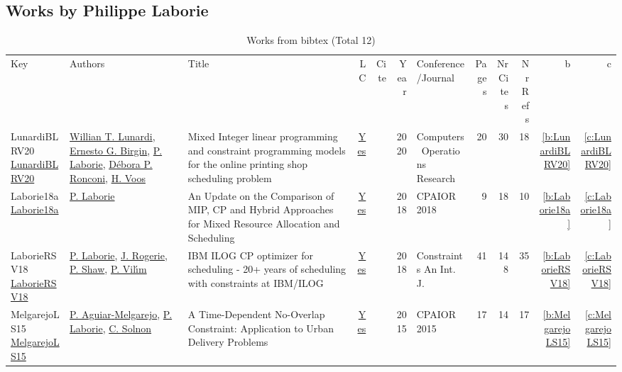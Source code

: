 \subsection{Works by Philippe Laborie}
\label{sec:a118}
{\scriptsize
\begin{longtable}{>{\raggedright\arraybackslash}p{3cm}>{\raggedright\arraybackslash}p{6cm}>{\raggedright\arraybackslash}p{6.5cm}rrrp{2.5cm}rrrrr}
\rowcolor{white}\caption{Works from bibtex (Total 12)}\\ \toprule
\rowcolor{white}Key & Authors & Title & LC & Cite & Year & \shortstack{Conference\\/Journal} & Pages & \shortstack{Nr\\Cites} & \shortstack{Nr\\Refs} & b & c \\ \midrule\endhead
\bottomrule
\endfoot
LunardiBLRV20 \href{https://doi.org/10.1016/j.cor.2020.105020}{LunardiBLRV20} & \hyperref[auth:a512]{Willian T. Lunardi}, \hyperref[auth:a513]{Ernesto G. Birgin}, \hyperref[auth:a118]{P. Laborie}, \hyperref[auth:a514]{D{\'{e}}bora P. Ronconi}, \hyperref[auth:a515]{H. Voos} & Mixed Integer linear programming and constraint programming models for the online printing shop scheduling problem & \href{works/LunardiBLRV20.pdf}{Yes} & \cite{LunardiBLRV20} & 2020 & Computers \  Operations Research & 20 & 30 & 18 & \ref{b:LunardiBLRV20} & \ref{c:LunardiBLRV20}\\
Laborie18a \href{https://doi.org/10.1007/978-3-319-93031-2\_29}{Laborie18a} & \hyperref[auth:a118]{P. Laborie} & An Update on the Comparison of MIP, {CP} and Hybrid Approaches for Mixed Resource Allocation and Scheduling & \href{works/Laborie18a.pdf}{Yes} & \cite{Laborie18a} & 2018 & CPAIOR 2018 & 9 & 18 & 10 & \ref{b:Laborie18a} & \ref{c:Laborie18a}\\
LaborieRSV18 \href{https://doi.org/10.1007/s10601-018-9281-x}{LaborieRSV18} & \hyperref[auth:a118]{P. Laborie}, \hyperref[auth:a119]{J. Rogerie}, \hyperref[auth:a120]{P. Shaw}, \hyperref[auth:a121]{P. Vil{\'{\i}}m} & {IBM} {ILOG} {CP} optimizer for scheduling - 20+ years of scheduling with constraints at {IBM/ILOG} & \href{works/LaborieRSV18.pdf}{Yes} & \cite{LaborieRSV18} & 2018 & Constraints An Int. J. & 41 & 148 & 35 & \ref{b:LaborieRSV18} & \ref{c:LaborieRSV18}\\
MelgarejoLS15 \href{https://doi.org/10.1007/978-3-319-18008-3\_1}{MelgarejoLS15} & \hyperref[auth:a325]{P. Aguiar{-}Melgarejo}, \hyperref[auth:a118]{P. Laborie}, \hyperref[auth:a85]{C. Solnon} & A Time-Dependent No-Overlap Constraint: Application to Urban Delivery Problems & \href{works/MelgarejoLS15.pdf}{Yes} & \cite{MelgarejoLS15} & 2015 & CPAIOR 2015 & 17 & 14 & 17 & \ref{b:MelgarejoLS15} & \ref{c:MelgarejoLS15}\\

\end{longtable}}
